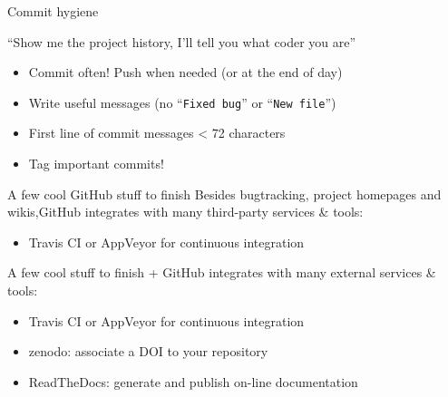 \documentclass[compress]{beamer}
\begin{document}
\begin{frame}{Commit hygiene}
    \centering

    {\Medium ``Show me the project history, I'll tell you what coder you are''}

    \begin{itemize}
        \item<1> {\Medium Commit often!} Push when needed (or at the end of day)
        \item<2> Write useful messages (no ``\texttt{Fixed bug}'' or ``\texttt{New
            file}'')
        \item<2> First line of commit messages < 72 characters
        \item<3> Tag important commits!
    \end{itemize}

\end{frame}

\begin{frame}{A few cool GitHub stuff to finish}
    Besides bugtracking, project homepages and wikis,GitHub integrates with many
    third-party services \& tools:

    \begin{itemize}
        \item {\Medium Travis CI} or {\Medium AppVeyor} for continuous integration
    \end{itemize}
\end{frame}


\begin{frame}{A few cool stuff to finish}
    + GitHub integrates with many external services 
    \& tools:

    \begin{itemize}
        \item {\Medium Travis CI} or {\Medium AppVeyor} for continuous integration
        \item {\Medium zenodo}: associate a DOI to your repository
        \item {\Medium ReadTheDocs}: generate and publish on-line 
            documentation
    \end{itemize}
\end{frame}

\end{document}
